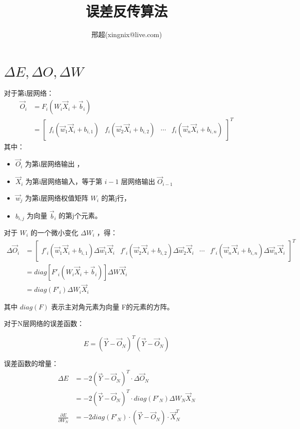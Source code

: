 \documentclass{article}
\begin{document}
\title{误差反传算法}
\author{邢超(xingnix@live.com)}
\maketitle


\section{ $\Delta E,\Delta O,\Delta W$}

对于第i层网络：
\begin{align*}
\vec O_i &=F_i(W_i\vec X_i+\vec b_i)\\
&=\begin{bmatrix}
f_i(\vec w_1 \vec X_i+b_{i,1})  &  f_i(\vec w_2 \vec X_i+b_{i,2}) & \cdots & f_i(\vec w_n \vec X_i +b_{i,n})
\end{bmatrix}^T
\end{align*}
其中：
\begin{itemize}
\item $\vec O_i$ 为第i层网络输出 ，
\item $\vec X_i$ 为第i层网络输入，等于第 $i-1$ 层网络输出 $\vec O_{i-1}$
\item $\vec w_j$ 为第i层网络权值矩阵 $W_i$ 的第j行， 
\item $b_{i,j}$ 为向量 $\vec b_i$ 的第j个元素。
\end{itemize}

对于 $W_i$ 的一个微小变化 $\Delta W_i$ ，得：
\begin{align*}
\Delta \vec O_i &=\begin{bmatrix}
f'_i(\vec w_1 \vec X_i+b_{i,1})\Delta \vec w_1 \vec X_i  &  f'_i(\vec w_2 \vec X_i+b_{i,2})\Delta \vec w_2 \vec X_i & \cdots & f'_i(\vec w_n \vec X_i +b_{i,n})\Delta \vec w_n \vec X_i
\end{bmatrix}^T \\
&=diag[F'_i(W_i\vec X_i+\vec b_i)]\Delta W\vec X_i \\
&=diag(F'_i)\Delta W_i \vec X_i
\end{align*}


其中 $diag(F)$ 表示主对角元素为向量 F的元素的方阵。



对于N层网络的误差函数：

\[E=(\vec{Y}-\vec O_N)^T(\vec{Y}-\vec O_N)\]


误差函数的增量：
\begin{align*}
\Delta E &=-2(\vec Y-\vec O_N)^T\cdot \Delta\vec O_N\\
&=-2(\vec Y-\vec O_N)^T\cdot diag(F'_N)\Delta W_N \vec X_N\\
\frac{\partial E}{\partial W_N}&=-2 diag(F'_N)\cdot(\vec Y-\vec O_N)\cdot \vec X_N^T
\end{align*}
\end{document}
